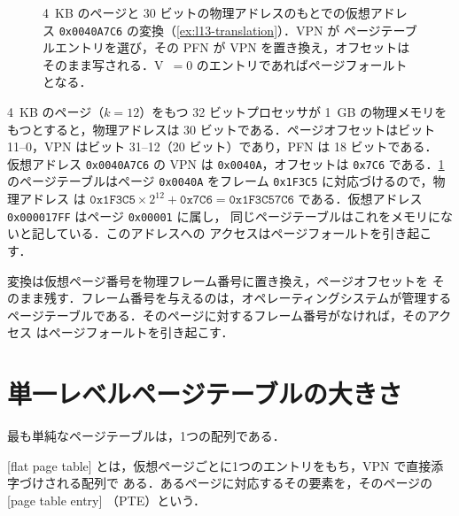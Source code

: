 \documentclass[../main.tex]{subfiles}
\begin{document}
\begin{figure}[htbp]
  \centering
  
  \caption{4~KB のページと 30 ビットの物理アドレスのもとでの仮想アドレス
    \texttt{0x0040A7C6} の変換（\cref{ex:l13-translation}）．VPN が
    ページテーブルエントリを選び，その PFN が VPN を置き換え，オフセットは
    そのまま写される．V~$=0$ のエントリであればページフォールトとなる．}
  \label{fig:l13-translation}
\end{figure}

\begin{example}
  \label{ex:l13-translation}
  4~KB のページ（$k = 12$）をもつ 32 ビットプロセッサが 1~GB の物理メモリを
  もつとすると，物理アドレスは 30 ビットである．ページオフセットはビット
  11--0，VPN はビット 31--12（20 ビット）であり，PFN は 18 ビットである．
  仮想アドレス \texttt{0x0040A7C6} の VPN は \texttt{0x0040A}，オフセットは
  \texttt{0x7C6} である．\cref{fig:l13-translation} のページテーブルはページ
  \texttt{0x0040A} をフレーム \texttt{0x1F3C5} に対応づけるので，物理アドレス
  は $\texttt{0x1F3C5} \times 2^{12} + \texttt{0x7C6} = \texttt{0x1F3C57C6}$
  である．仮想アドレス \texttt{0x000017FF} はページ \texttt{0x00001} に属し，
  同じページテーブルはこれをメモリにないと記している．このアドレスへの
  アクセスはページフォールトを引き起こす．
\end{example}


\begin{keypoint}
  変換は仮想ページ番号を物理フレーム番号に置き換え，ページオフセットを
  そのまま残す．フレーム番号を与えるのは，オペレーティングシステムが管理する
  ページテーブルである．そのページに対するフレーム番号がなければ，そのアクセス
  はページフォールトを引き起こす．
\end{keypoint}

\section{単一レベルページテーブルの大きさ}
\label{sec:l13-flat}

最も単純なページテーブルは，1つの配列である．

\begin{definition}[単一レベルページテーブル]
  [flat page table]%
  とは，仮想ページごとに1つのエントリをもち，VPN で直接添字づけされる配列で
  ある．あるページに対応するその要素を，そのページの
  [page table entry]%
  （PTE）という．
\end{definition}
\end{document}
